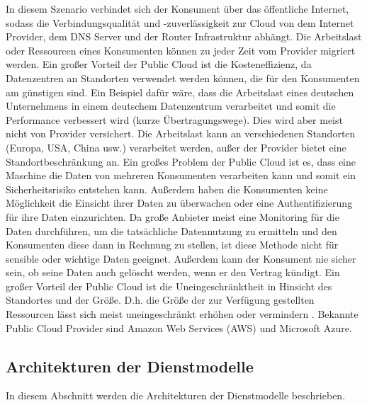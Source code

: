 In diesem Szenario verbindet sich der Konsument über das öffentliche Internet, sodass die Verbindungsqualität und -zuverlässigkeit zur Cloud
von dem Internet Provider, dem DNS Server und der Router Infrastruktur abhängt. Die Arbeitslast oder Ressourcen eines Konsumenten können zu jeder Zeit
vom Provider migriert werden. Ein großer Vorteil der Public Cloud ist die Kosteneffizienz, da Datenzentren an Standorten verwendet werden können, die für den Konsumenten am günstigen sind.
Ein Beispiel dafür wäre, dass die Arbeitslast eines deutschen Unternehmens in einem deutschem Datenzentrum verarbeitet und somit die Performance verbessert wird (kurze Übertragungswege).
Dies wird aber meist nicht von Provider versichert. Die Arbeitslast kann an verschiedenen Standorten (Europa, USA, China usw.) verarbeitet werden, außer der Provider bietet eine
Standortbeschränkung an. Ein großes Problem der Public Cloud ist es, dass eine Maschine die Daten von mehreren Konsumenten verarbeiten kann und somit ein Sicherheitsrisiko entstehen kann.
Außerdem haben die Konsumenten keine Möglichkeit die Einsicht ihrer Daten zu überwachen oder eine Authentifizierung für ihre Daten einzurichten. Da große Anbieter meist eine Monitoring für die
Daten durchführen, um die tatsächliche Datennutzung zu ermitteln und den Konsumenten diese dann in Rechnung zu stellen, ist diese Methode nicht für sensible oder wichtige Daten geeignet.
Außerdem kann der Konsument nie sicher sein, ob seine Daten auch gelöscht werden, wenn er den Vertrag kündigt. 
Ein großer Vorteil der Public Cloud ist die Uneingeschränktheit in Hinsicht des Standortes und der Größe. D.h. die Größe der zur Verfügung gestellten Ressourcen lässt sich 
meist \glqq uneingeschränkt\grqq{} erhöhen oder vermindern \cite{Badger}.
Bekannte Public Cloud Provider sind Amazon Web Services (AWS) und Microsoft Azure. 

\subsection{Architekturen der Dienstmodelle}
In diesem Abschnitt werden die Architekturen der Dienstmodelle beschrieben.

